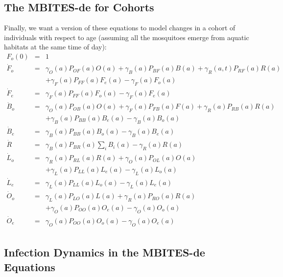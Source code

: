 \documentclass{article}
\begin{document}
\subsection{The MBITES-de for Cohorts}

Finally, we want a version of these equations to model changes in a cohort of individuals with respect to age (assuming all the mosquitoes emerge from aquatic habitats at the same time of day): 
\begin{equation}\begin{array}{rcl}
F_o(0) &=& 1 \\ 
%
{\dot F}_o&=& 
\gamma_O(a) P_{OF}(a) O(a) 
+ \gamma_B(a) P_{BF}(a) B(a) 
 + \gamma_R(a,t) P_{RF}(a) R(a)
\\ &&
+ \gamma_F(a) P_{FF}(a) F_e(a) 
- \gamma_F(a) F_o(a) \\ 
%
{\dot F}_e &=&  \gamma_F(a) P_{FF}(a) F_o (a) - \gamma_F(a) F_e(a) \\ 
%
%
{\dot B}_o &=&  \gamma_O(a) P_{OB}(a) O(a) + \gamma_F(a) P_{FB}(a) F(a) 
+ \gamma_R(a) P_{RB}(a) R(a) \\ && 
+ \gamma_B(a) P_{BB}(a) B_e(a)
- \gamma_B(a) B_o(a)\\
%
{\dot B}_e &=& \gamma_B(a) P_{BB}(a) B_o(a) -
\gamma_B(a) B_e(a) 
\\
%
{\dot R} &=&  \gamma_B(a) P_{BR}(a) \sum_i B_i(a) - \gamma_R(a) R(a)\\ 
%
{\dot L}_o&=& \gamma_R(a) P_{RL}(a) R(a) + 
\gamma_O(a) P_{OL}(a) O(a) \\&&
+ \gamma_L(a)  P_{LL}(a) L_e(a)
- \gamma_L(a) L_o(a)
\\ 
%
{\dot L}_e &=& \gamma_L(a) P_{LL}(a) L_o (a) - \gamma_L(a) L_e(a)
\\ 
%
{\dot O}_o &=& \gamma_L(a) P_{LO}(a) L(a) 
+ \gamma_R(a) P_{RO}(a) R(a)  
\\&& 
+ \gamma_O(a) P_{OO}(a) O_e(a)
- \gamma_O(a) O_o(a)
\\ 
%
{\dot O}_e &=& \gamma_O(a) P_{OO}(a) O_o (a) - \gamma_O(a) O_e(a)
\\ 
%
\end{array}\end{equation}

\subsection{Infection Dynamics in the MBITES-de Equations}
\end{document}
